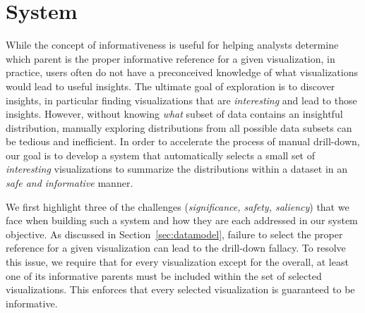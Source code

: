 \section{System\label{sec:system}}
While the concept of informativeness is useful for helping analysts determine which parent is the proper informative reference for a given visualization, in practice, users often do not have a preconceived knowledge of what visualizations would lead to useful insights. The ultimate goal of exploration is to discover insights, in particular finding visualizations that are \textit{interesting} and lead to those insights. %
However, without knowing \textit{what} subset of data contains an insightful distribution, manually exploring distributions from all possible data subsets can be tedious and inefficient. In order to accelerate the process of manual drill-down, our goal is to develop a system that automatically selects a small set of \textit{interesting} visualizations to summarize the distributions within a dataset in an \textit{safe and informative} manner.
\par We first highlight three of the challenges (\textit{significance, safety, saliency}) that we face when building such a system and how they are each addressed in our system objective.
 As discussed in Section~\ref{sec:datamodel}, failure to select the proper reference for a given visualization can lead to the drill-down fallacy. To resolve this issue, we require that for every visualization except for the overall, at least one of its informative parents must be included within the set of selected visualizations. This enforces that every selected visualization is guaranteed to be informative. %
